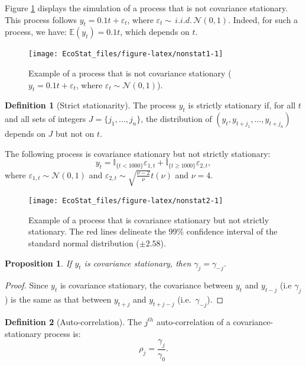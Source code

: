 \documentclass[
  12pt,
]{book}
\newtheorem{proposition}{Proposition}[chapter]
\theoremstyle{definition}
\newtheorem{definition}{Definition}[chapter]
\theoremstyle{definition}
\theoremstyle{definition}
\theoremstyle{definition}
\theoremstyle{remark}
\begin{document}
Figure \ref{fig:nonstat1} displays the simulation of a process that is not covariance stationary. This process follows \(y_t = 0.1t + \varepsilon_t\), where \(\varepsilon_t \sim\,i.i.d.\,\mathcal{N}(0,1)\). Indeed, for such a process, we have: \(\mathbb{E}(y_t)=0.1t\), which depends on \(t\).

\begin{figure}
\texttt{[image: EcoStat\_files/figure-latex/nonstat1-1]} \caption{Example of a process that is not covariance stationary ($y_t = 0.1t + \varepsilon_t$, where $\varepsilon_t \sim \mathcal{N}(0,1)$).}\label{fig:nonstat1}
\end{figure}

\begin{definition}[Strict stationarity]
\protect\hypertarget{def:strictstat}{}\label{def:strictstat}The process \(y_t\) is strictly stationary if, for all \(t\) and all sets of integers \(J=\{j_1,\dots,j_n\}\), the distribution of \((y_{t},y_{t+j_1},\dots,y_{t+j_n})\) depends on \(J\) but not on \(t\).
\end{definition}

The following process is covariance stationary but not strictly stationary:
\[
y_t = \mathbb{I}_{\{t<1000\}}\varepsilon_{1,t}+\mathbb{I}_{\{t\ge1000\}}\varepsilon_{2,t},
\]
where \(\varepsilon_{1,t} \sim \mathcal{N}(0,1)\) and \(\varepsilon_{2,t} \sim \sqrt{\frac{\nu - 2}{\nu}} t(\nu)\) and \(\nu = 4\).

\begin{figure}
\texttt{[image: EcoStat\_files/figure-latex/nonstat2-1]} \caption{Example of a process that is covariance stationary but not strictly stationary. The red lines delineate the 99\% confidence interval of the standard normal distribution ($\pm 2.58$).}\label{fig:nonstat2}
\end{figure}

\begin{proposition}
\protect\hypertarget{prp:gammaMinus}{}\label{prp:gammaMinus}If \(y_t\) is covariance stationary, then \(\gamma_j = \gamma_{-j}\).
\end{proposition}

\begin{proof}
Since \(y_t\) is covariance stationary, the covariance between \(y_t\) and \(y_{t-j}\) (i.e \(\gamma_j\)) is the same as that between \(y_{t+j}\) and \(y_{t+j-j}\) (i.e.~\(\gamma_{-j}\)).
\end{proof}

\begin{definition}[Auto-correlation]
\protect\hypertarget{def:autocor}{}\label{def:autocor}The \(j^{th}\) auto-correlation of a covariance-stationary process is:
\[
\rho_j = \frac{\gamma_j}{\gamma_0}.
\]
\end{definition}
\end{document}
